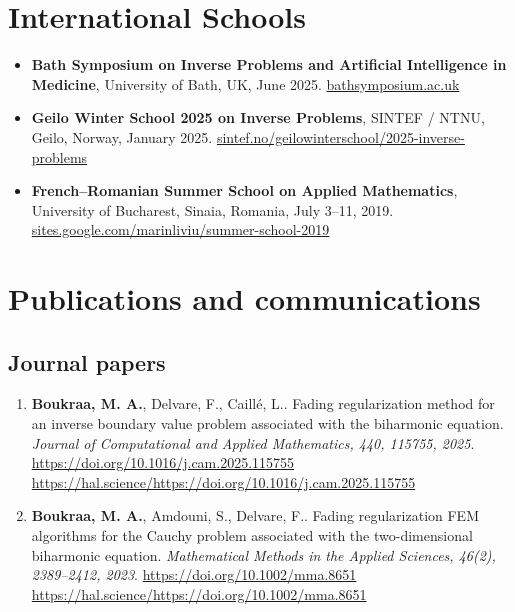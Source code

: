 \documentclass[10pt]{article} %
\begin{document}
\section*{International Schools}

\begin{itemize}

  \item \textbf{Bath Symposium on Inverse Problems and Artificial Intelligence in Medicine},  
  University of Bath, UK, June 2025.  
  \href{https://bathsymposium.ac.uk/symposium/inverse-problems-and-artificial-intelligence-in-medicine/}{bathsymposium.ac.uk}

  \item \textbf{Geilo Winter School 2025 on Inverse Problems},  
  SINTEF / NTNU, Geilo, Norway, January 2025.  
  \href{https://www.sintef.no/projectweb/geilowinterschool/2025-inverse-problems/}{sintef.no/geilowinterschool/2025-inverse-problems}


  \item \textbf{French–Romanian Summer School on Applied Mathematics},  
  University of Bucharest, Sinaia, Romania, July 3–11, 2019.  
  \href{https://sites.google.com/site/marinliviu/french-romanian-summer-school-on-applied-mathematics/6th-french-romanian-summer-school-on-applied-mathematics-3-11-july-2019}{sites.google.com/marinliviu/summer-school-2019}
\end{itemize}

\section{Publications and communications}
\subsection{Journal papers}
\begin{enumerate}
\item \textbf{Boukraa, M. A.}, Delvare, F., Caill{\'e}, L.. Fading regularization method for an inverse boundary value problem associated with the biharmonic equation. \textit{Journal of Computational and Applied Mathematics, 440, 115755, 2025}. \url{https://doi.org/10.1016/j.cam.2025.115755} \url{https://hal.science/https://doi.org/10.1016/j.cam.2025.115755}
\item \textbf{Boukraa, M. A.}, Amdouni, S., Delvare, F.. Fading regularization FEM algorithms for the Cauchy problem associated with the two-dimensional biharmonic equation. \textit{Mathematical Methods in the Applied Sciences, 46(2), 2389--2412, 2023}. \url{https://doi.org/10.1002/mma.8651} \url{https://hal.science/https://doi.org/10.1002/mma.8651}
\end{enumerate}
\end{document}

